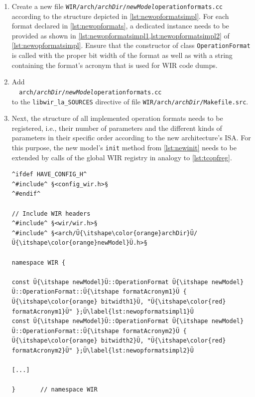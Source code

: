 \begin{enumerate}[resume]
  \item Create a new file \texttt{WIR/arch/{\itshape archDir}/{\itshape newModel}operationformats.cc} according to the structure depicted in \cref{lst:newopformatsimpl}.
  For each format declared in \cref{lst:newopformats}, a dedicated instance needs to be provided as shown in \cref{lst:newopformatsimpl1,lst:newopformatsimpl2} of \cref{lst:newopformatsimpl}.
  Ensure that the constructor of class \texttt{OperationFormat} is called with the proper bit width of the format as well as with a string containing the format's acronym that is used for \gls{WIR} code dumps.

  \item Add \\
  \verb|  arch/|\texttt{\itshape archDir}\verb|/|\texttt{\itshape newModel}\verb|operationformats.cc| \\
  to the \texttt{libwir\_la\_SOURCES} directive of file \texttt{WIR/arch/{\itshape archDir}/Makefile.src}.
  \item Next, the structure of all implemented operation formats needs to be registered, i.e., their number of parameters and the different kinds of parameters in their specific order according to the new architecture's \gls{ISA}.
  For this purpose, the new model's \texttt{init} method from \cref{lst:newinit} needs to be extended by calls of the global \gls{WIR} registry in analogy to \cref{lst:tcopfreg}.

\begin{lstlisting}[style=code,float=!b,caption={Implementation of a New Processor Model's Operation Formats},label=lst:newopformatsimpl]
^ifdef HAVE_CONFIG_H^
^#include^ §<config_wir.h>§
^#endif^

// Include WIR headers
^#include^ §<wir/wir.h>§
^#include^ §<arch/Ü{\itshape\color{orange}archDir}Ü/Ü{\itshape\color{orange}newModel}Ü.h>§

namespace WIR {

const Ü{\itshape newModel}Ü::OperationFormat Ü{\itshape newModel}Ü::OperationFormat::Ü{\itshape formatAcronym1}Ü { Ü{\itshape\color{orange} bitwidth1}Ü, "Ü{\itshape\color{red} formatAcronym1}Ü" };Ü\label{lst:newopformatsimpl1}Ü
const Ü{\itshape newModel}Ü::OperationFormat Ü{\itshape newModel}Ü::OperationFormat::Ü{\itshape formatAcronym2}Ü { Ü{\itshape\color{orange} bitwidth2}Ü, "Ü{\itshape\color{red} formatAcronym2}Ü" };Ü\label{lst:newopformatsimpl2}Ü

[...]

}       // namespace WIR
\end{lstlisting}


\end{enumerate}
